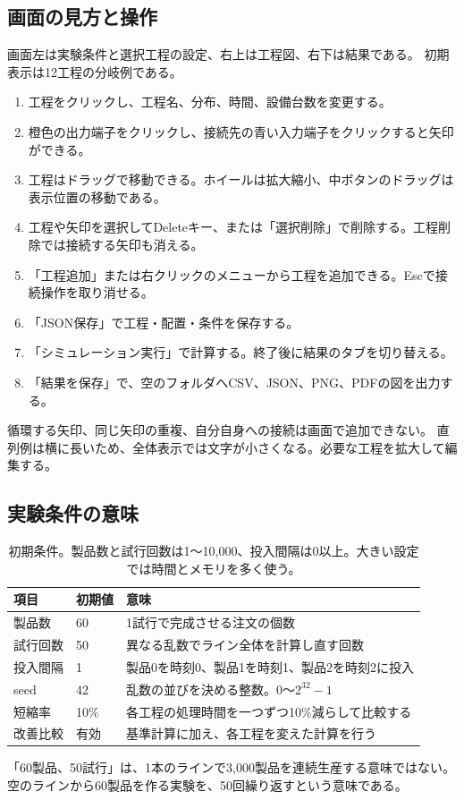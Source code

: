 \documentclass[a4paper,11pt]{ltjsarticle}
\begin{document}
\subsection{画面の見方と操作}
画面左は実験条件と選択工程の設定、右上は工程図、右下は結果である。
初期表示は12工程の分岐例である。
\begin{enumerate}
\item 工程をクリックし、工程名、分布、時間、設備台数を変更する。
\item 橙色の出力端子をクリックし、接続先の青い入力端子をクリックすると矢印ができる。
\item 工程はドラッグで移動できる。ホイールは拡大縮小、中ボタンのドラッグは表示位置の移動である。
\item 工程や矢印を選択してDeleteキー、または「選択削除」で削除する。工程削除では接続する矢印も消える。
\item 「工程追加」または右クリックのメニューから工程を追加できる。Escで接続操作を取り消せる。
\item 「JSON保存」で工程・配置・条件を保存する。
\item 「シミュレーション実行」で計算する。終了後に結果のタブを切り替える。
\item 「結果を保存」で、空のフォルダへCSV、JSON、PNG、PDFの図を出力する。
\end{enumerate}
循環する矢印、同じ矢印の重複、自分自身への接続は画面で追加できない。
直列例は横に長いため、全体表示では文字が小さくなる。必要な工程を拡大して編集する。

\subsection{実験条件の意味}
\begin{table}[htbp]\centering\small
\begin{tabularx}{\linewidth}{P{31mm}P{22mm}Y}
\toprule 項目 & 初期値 & 意味\\\midrule
製品数 & 60 & 1試行で完成させる注文の個数\\
試行回数 & 50 & 異なる乱数でライン全体を計算し直す回数\\
投入間隔 & 1 & 製品0を時刻0、製品1を時刻1、製品2を時刻2に投入\\
seed & 42 & 乱数の並びを決める整数。0〜$2^{32}-1$\\
短縮率 & 10\% & 各工程の処理時間を一つずつ10\%減らして比較する\\
改善比較 & 有効 & 基準計算に加え、各工程を変えた計算を行う\\
\bottomrule\end{tabularx}
\caption{初期条件。製品数と試行回数は1〜10,000、投入間隔は0以上。大きい設定では時間とメモリを多く使う。}
\end{table}
「60製品、50試行」は、1本のラインで3,000製品を連続生産する意味ではない。
空のラインから60製品を作る実験を、50回繰り返すという意味である。
\end{document}
